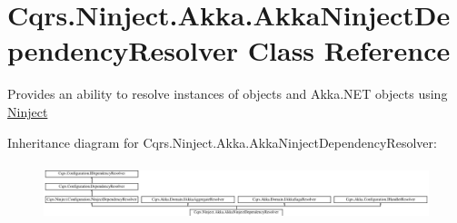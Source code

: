 \hypertarget{classCqrs_1_1Ninject_1_1Akka_1_1AkkaNinjectDependencyResolver}{}\section{Cqrs.\+Ninject.\+Akka.\+Akka\+Ninject\+Dependency\+Resolver Class Reference}
\label{classCqrs_1_1Ninject_1_1Akka_1_1AkkaNinjectDependencyResolver}


Provides an ability to resolve instances of objects and Akka.\+N\+ET objects using \hyperlink{namespaceCqrs_1_1Ninject}{Ninject}  


Inheritance diagram for Cqrs.\+Ninject.\+Akka.\+Akka\+Ninject\+Dependency\+Resolver\+:\begin{figure}[H]
\begin{center}
\leavevmode
\includegraphics[height=1.676647cm]{classCqrs_1_1Ninject_1_1Akka_1_1AkkaNinjectDependencyResolver}
\end{center}
\end{figure}
